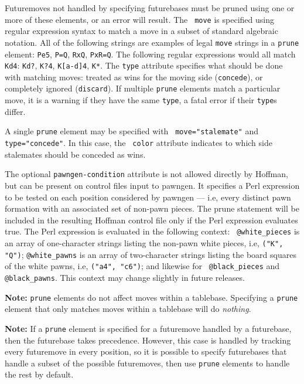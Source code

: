\documentclass[11pt]{article}
\begin{document}
Futuremoves not handled by specifying futurebases must be pruned using
one or more of these elements, or an error will result.  The {\tt
  move} is specified using regular expression syntax to match a move
in a subset of standard algebraic notation.  All of the following
strings are examples of legal {\tt move} strings in a {\tt prune}
element: {\tt Pe5}, {\tt P=Q}, {\tt RxQ}, {\tt PxR=Q}.  The following
regular expressions would all match {\tt Kd4}: {\tt Kd?}, {\tt K?4},
{\tt K[a-d]4}, {\tt K*}.  The {\tt type} attribute specifies what
should be done with matching moves: treated as wins for the moving
side ({\tt concede}), or completely ignored ({\tt discard}).  If
multiple {\tt prune} elements match a particular move, it is a warning
if they have the same {\tt type}, a fatal error if their {\tt type}s
differ.

A single {\tt prune} element may be specified with {\tt
move="stalemate"} and {\tt type="concede"}.  In this case, the {\tt
color} attribute indicates to which side stalemates should be conceded
as wins.

The optional {\tt pawngen-condition} attribute is not allowed directly
by Hoffman, but can be present on control files input to pawngen.  It
specifies a Perl expression to be tested on each position considered
by pawngen --- i.e, every distinct pawn formation with an associated
set of non-pawn pieces.  The prune statement will be included in the
resulting Hoffman control file only if the Perl expression evaluates
true.  The Perl expression is evaluated in the following context: {\tt
@white\_pieces} is an array of one-character strings listing the
non-pawn white pieces, i.e, {\tt ("K", "Q")}; {\tt @white\_pawns} is
an array of two-character strings listing the board squares of the
white pawns, i.e, {\tt ("a4", "c6")}; and likewise for {\tt
@black\_pieces} and {\tt @black\_pawns}.  This context may change
slightly in future releases.

{\bf Note:} {\tt prune} elements do not affect moves within a
tablebase.  Specifying a {\tt prune} element that only matches
moves within a tablebase will do {\it nothing}.

{\bf Note:} If a {\tt prune} element is specified for a futuremove
handled by a futurebase, then the futurebase takes precedence.
However, this case is handled by tracking every futuremove in every
position, so it is possible to specify futurebases that handle a
subset of the possible futuremoves, then use {\tt prune} elements to
handle the rest by default.
\end{document}
